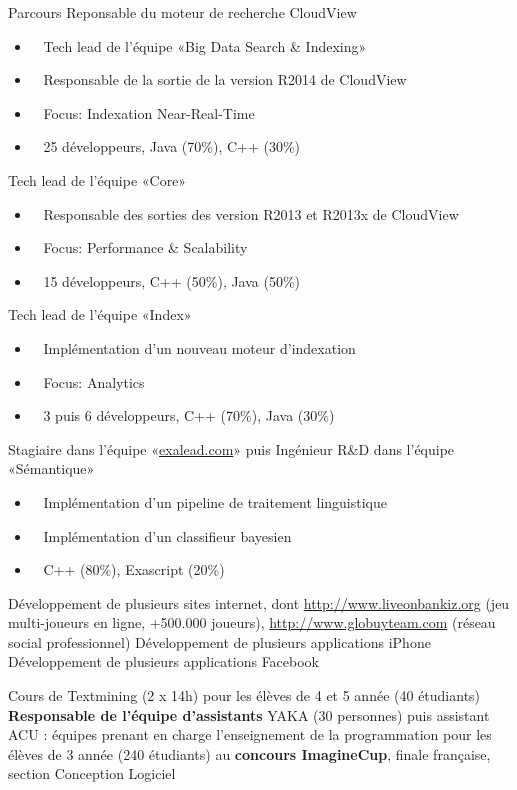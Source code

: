 \begin{rubric}{Parcours}
    \entry*[Depuis 2013]
      Reponsable du moteur de recherche CloudView
      \begin{itemize}
        \item{}~ Tech lead de l'équipe «Big Data Search \& Indexing»
        \item{}~ Responsable de la sortie de la version R2014 de CloudView
        \item{}~ Focus: Indexation Near-Real-Time
        \item{}~ 25 développeurs, Java {\tiny (70\%)}, C++ {\tiny (30\%)}
      \end{itemize}
    \entry*[2012]
      Tech lead de l'équipe «Core»
      \begin{itemize}
        \item{}~ Responsable des sorties des version R2013 et R2013x de CloudView
        \item{}~ Focus: Performance \& Scalability
        \item{}~ 15 développeurs, C++ {\tiny (50\%)}, Java {\tiny (50\%)}
      \end{itemize}
    \entry*[2010-2011]
      Tech lead de l'équipe «Index»
      \begin{itemize}
        \item{}~ Implémentation d'un nouveau moteur d'indexation
        \item{}~ Focus: Analytics
        \item{}~ 3 puis 6 développeurs, C++ {\tiny (70\%)}, Java {\tiny (30\%)}
      \end{itemize}
	  \entry*[2008-2009]
	    Stagiaire dans l'équipe «\url{exalead.com}» puis Ingénieur R\&D dans l'équipe «Sémantique»
	    \begin{itemize}
        \item{}~ Implémentation d'un pipeline de traitement linguistique
        \item{}~ Implémentation d'un classifieur bayesien
        \item{}~ C++ {\tiny (80\%)}, Exascript {\tiny (20\%)}
      \end{itemize}

		\entry*[Depuis 2003] Développement de plusieurs sites internet, dont \url{http://www.liveonbankiz.org} (jeu multi-joueurs en ligne, +500.000 joueurs), \url{http://www.globuyteam.com} (réseau social professionnel)
		\entry*[Depuis 2011] Développement de plusieurs applications iPhone
		\entry*[2007-2011] Développement de plusieurs applications Facebook

	  \entry*[Depuis 2010] Cours de Textmining (2 x 14h) pour les élèves de 4 et 5 année (40 étudiants)
		\entry*[2006-2007] \textbf{Responsable de l'équipe d'assistants} YAKA (30 personnes) puis assistant ACU : équipes prenant en charge l'enseignement de la programmation pour les élèves de 3 année (240 étudiants)
		 au \textbf{concours ImagineCup}, finale française, section Conception Logiciel
\end{rubric}

